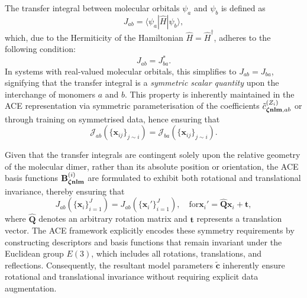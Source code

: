  The transfer integral between molecular orbitals \(\psi_a\) and \(\psi_b\) is defined as 
\[J_{ab} = \langle \psi_a | \hat{H} | \psi_b \rangle,\]
which, due to the Hermiticity of the Hamiltonian \(\hat{H} = \hat{H}^\dagger\), adheres to the following condition: 
 \begin{equation}
\label{equ:15}
J_{ab} = J_{ba}^*.
\end{equation}
 In systems with real-valued molecular orbitals, this simplifies to \(J_{ab} = J_{ba}\), signifying that the transfer integral is a \textit{symmetric scalar quantity} upon the interchange of monomers \(a\) and \(b\).  
 This property is inherently maintained in the ACE representation via symmetric parameterisation of the coefficients \(\tilde{c}^{(Z_i)}_{{\bm\zeta}{\bf nlm},ab}\) or through training on symmetrised data, hence ensuring that 
\begin{equation}
\label{equ:16}
\mathcal{J}_{ab}\!\left(\{\mathbf{x}_{ij}\}_{j \sim i}\right)
= \mathcal{J}_{ba}\!\left(\{\mathbf{x}_{ij}\}_{j \sim i}\right).
\end{equation}

 Given that the transfer integrals are contingent solely upon the relative geometry of the molecular dimer, rather than its absolute position or orientation, the ACE basis functions \(\mathbf{B}^{(i)}_{{\bm\zeta}{\bf nlm}}\) are formulated to exhibit both rotational and translational invariance, thereby ensuring that 
\begin{equation}
\label{equ:17}
J_{ab}\!\left(\{\mathbf{x}_{i}\}_{i=1}^{J}\right)
= J_{ab}\!\left(\{\mathbf{x}_{i}'\}_{i=1}^{J}\right),
\quad \text{for} 
\mathbf{x}_i' = \hat{\mathbf{Q}}\mathbf{x}_i + \mathbf{t},
\end{equation}
 where \(\hat{\mathbf{Q}}\) denotes an arbitrary rotation matrix and \(\mathbf{t}\) represents a translation vector.  
 The ACE framework explicitly encodes these symmetry requirements by constructing descriptors and basis functions that remain invariant under the Euclidean group \(E(3)\), which includes all rotations, translations, and reflections.  
 Consequently, the resultant model parameters \(\tilde{\mathbf{c}}\) inherently ensure rotational and translational invariance without requiring explicit data augmentation.

